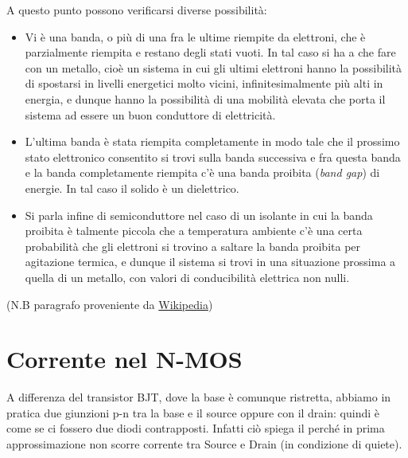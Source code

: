 \documentclass[
]{book}
\providecommand{\tightlist}{%
  \setlength{\itemsep}{0pt}\setlength{\parskip}{0pt}}
\begin{document}
A questo punto possono verificarsi diverse possibilità:

\begin{itemize}
\tightlist
\item
  Vi è una banda, o più di una fra le ultime riempite da elettroni, che
  è parzialmente riempita e restano degli stati vuoti. In tal caso si ha
  a che fare con un metallo, cioè un sistema in cui gli ultimi elettroni
  hanno la possibilità di spostarsi in livelli energetici molto vicini,
  infinitesimalmente più alti in energia, e dunque hanno la possibilità
  di una mobilità elevata che porta il sistema ad essere un buon
  conduttore di elettricità.
\item
  L'ultima banda è stata riempita completamente in modo tale che il
  prossimo stato elettronico consentito si trovi sulla banda successiva
  e fra questa banda e la banda completamente riempita c'è una banda
  proibita (\emph{band gap}) di energie. In tal caso il solido è un
  dielettrico.
\item
  Si parla infine di semiconduttore nel caso di un isolante in cui la
  banda proibita è talmente piccola che a temperatura ambiente c'è una
  certa probabilità che gli elettroni si trovino a saltare la banda
  proibita per agitazione termica, e dunque il sistema si trovi in una
  situazione prossima a quella di un metallo, con valori di
  conducibilità elettrica non nulli.
\end{itemize}

(N.B paragrafo proveniente da
\href{https://it.wikipedia.org/wiki/Struttura_elettronica_a_bande}{Wikipedia})

\section{Corrente nel N-MOS}\label{corrente-nel-n-mos}

A differenza del transistor BJT, dove la base è comunque ristretta,
abbiamo in pratica due giunzioni p-n tra la base e il source oppure con
il drain: quindi è come se ci fossero due diodi contrapposti. Infatti
ciò spiega il perché in prima approssimazione non scorre corrente tra
Source e Drain (in condizione di quiete).
\end{document}

